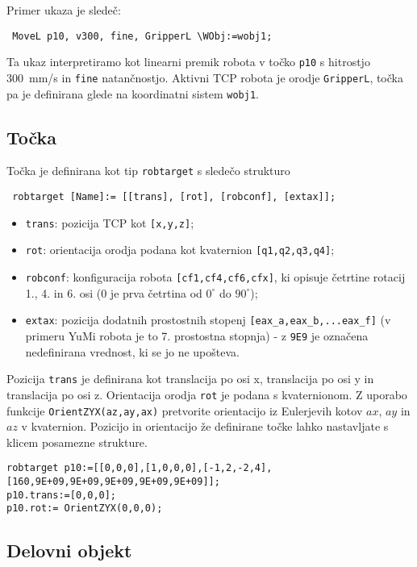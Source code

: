 Primer ukaza je sledeč:
{\small
\begin{verbatim}
 MoveL p10, v300, fine, GripperL \WObj:=wobj1;
\end{verbatim}
}
Ta ukaz interpretiramo kot linearni premik robota v točko \verb"p10" s hitrostjo 300~mm/s in \verb"fine" natančnostjo. Aktivni TCP robota je orodje \verb"GripperL", točka pa je definirana glede na koordinatni sistem  \verb"wobj1".

\subsection{Točka}

Točka je definirana kot tip \verb"robtarget" s sledečo strukturo
{\small
\begin{verbatim}
 robtarget [Name]:= [[trans], [rot], [robconf], [extax]];
\end{verbatim}
}
\begin{itemize}
  \item \verb"trans": pozicija TCP kot \verb"[x,y,z]";
  \item \verb"rot": orientacija orodja podana kot kvaternion \verb"[q1,q2,q3,q4]";
  \item \verb"robconf": konfiguracija robota \verb"[cf1,cf4,cf6,cfx]", ki opisuje četrtine rotacij 1., 4. in 6. osi (0 je prva četrtina od $0^\circ$ do $90^\circ$);
  \item \verb"extax": pozicija dodatnih prostostnih stopenj \verb"[eax_a,eax_b,...eax_f]" (v primeru YuMi robota je to 7. prostostna stopnja) - z \verb"9E9" je označena nedefinirana vrednost, ki se jo ne upošteva.
\end{itemize}

Pozicija  \verb"trans" je definirana kot translacija po osi x, translacija po osi y in translacija po osi z. Orientacija orodja \verb"rot" je podana s kvaternionom. Z uporabo funkcije \verb"OrientZYX(az,ay,ax)" pretvorite orientacijo iz Eulerjevih kotov $ax$, $ay$ in $az$ v kvaternion. Pozicijo in orientacijo že definirane točke lahko nastavljate s klicem posamezne strukture.

{\small
\begin{verbatim}
robtarget p10:=[[0,0,0],[1,0,0,0],[-1,2,-2,4],[160,9E+09,9E+09,9E+09,9E+09,9E+09]];
p10.trans:=[0,0,0];
p10.rot:= OrientZYX(0,0,0);
\end{verbatim}
}

\subsection{Delovni objekt}

